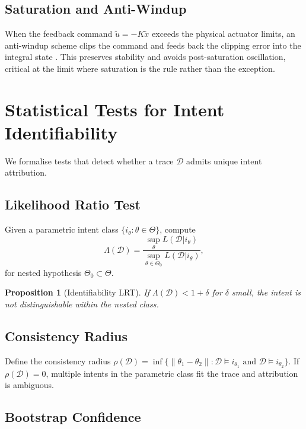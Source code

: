 \documentclass[11pt,twocolumn]{article}
\newtheorem{proposition}[theorem]{Proposition}
\theoremstyle{definition}
\theoremstyle{remark}
\begin{document}
\subsection{Saturation and Anti-Windup}

When the feedback command $\tilde u = -K\tilde x$ exceeds the physical actuator limits, an anti-windup scheme clips the command and feeds back the clipping error into the integral state \cite{astrom2010feedback}. This preserves stability and avoids post-saturation oscillation, critical at the limit where saturation is the rule rather than the exception.

\section{Statistical Tests for Intent Identifiability}
\label{app:identifiability}

We formalise tests that detect whether a trace $\mathcal{D}$ admits unique intent attribution.

\subsection{Likelihood Ratio Test}

Given a parametric intent class $\{i_\theta : \theta \in \Theta\}$, compute
\begin{equation}
\Lambda(\mathcal{D}) = \frac{\sup_{\theta} L(\mathcal{D} | i_\theta)}{\sup_{\theta \in \Theta_0} L(\mathcal{D} | i_\theta)},
\end{equation}
for nested hypothesis $\Theta_0 \subset \Theta$.

\begin{proposition}[Identifiability LRT]\label{prop:lrt}
If $\Lambda(\mathcal{D}) < 1 + \delta$ for $\delta$ small, the intent is not distinguishable within the nested class.
\end{proposition}

\subsection{Consistency Radius}

Define the consistency radius $\rho(\mathcal{D}) = \inf\{\|\theta_1 - \theta_2\| : \mathcal{D} \models i_{\theta_1} \text{ and } \mathcal{D} \models i_{\theta_2}\}$. If $\rho(\mathcal{D}) = 0$, multiple intents in the parametric class fit the trace and attribution is ambiguous.

\subsection{Bootstrap Confidence}
\end{document}
